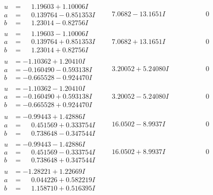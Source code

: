 \documentclass[1p]{elsarticle_modified}
\theoremstyle{definition}
\begin{document}
$$\begin{array}{c|c|c}
\begin{aligned}
u &= \phantom{-}1.19603 + 1.10006 I \\
a &= \phantom{-}0.139764 - 0.851353 I \\
b &= \phantom{-}1.23014 - 0.82756 I\end{aligned}
 & \phantom{-}7.0682 - 13.1651 I & \phantom{-0.000000 } 0 \\ \hline\begin{aligned}
u &= \phantom{-}1.19603 - 1.10006 I \\
a &= \phantom{-}0.139764 + 0.851353 I \\
b &= \phantom{-}1.23014 + 0.82756 I\end{aligned}
 & \phantom{-}7.0682 + 13.1651 I & \phantom{-0.000000 } 0 \\ \hline\begin{aligned}
u &= -1.10362 + 1.20410 I \\
a &= -0.160490 - 0.593138 I \\
b &= -0.665528 - 0.924470 I\end{aligned}
 & \phantom{-}3.20052 + 5.24080 I & \phantom{-0.000000 } 0 \\ \hline\begin{aligned}
u &= -1.10362 - 1.20410 I \\
a &= -0.160490 + 0.593138 I \\
b &= -0.665528 + 0.924470 I\end{aligned}
 & \phantom{-}3.20052 - 5.24080 I & \phantom{-0.000000 } 0 \\ \hline\begin{aligned}
u &= -0.99443 + 1.42886 I \\
a &= \phantom{-}0.451569 + 0.333754 I \\
b &= \phantom{-}0.738648 - 0.347544 I\end{aligned}
 & \phantom{-}16.0502 - 8.9937 I & \phantom{-0.000000 } 0 \\ \hline\begin{aligned}
u &= -0.99443 - 1.42886 I \\
a &= \phantom{-}0.451569 - 0.333754 I \\
b &= \phantom{-}0.738648 + 0.347544 I\end{aligned}
 & \phantom{-}16.0502 + 8.9937 I & \phantom{-0.000000 } 0 \\ \hline\begin{aligned}
u &= -1.28221 + 1.22669 I \\
a &= \phantom{-}0.044226 + 0.582219 I \\
b &= \phantom{-}1.158710 + 0.516395 I\end{aligned}

\end{array}$$
\end{document}
